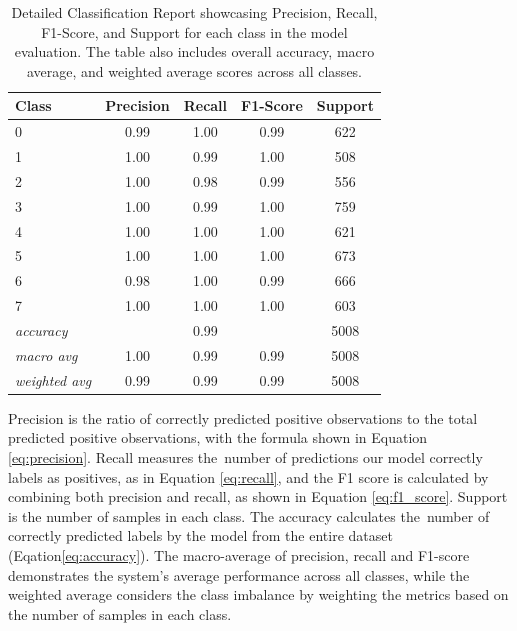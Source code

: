 \begin{table}[h]
	\centering
	\caption{Detailed Classification Report showcasing Precision, Recall, F1-Score, and Support for each class in the model evaluation. The table also includes overall accuracy, macro average, and weighted average scores across all classes.}
	\renewcommand{\arraystretch}{1.35} %
	\begin{tabular}{lcccc}
		\hline
		\textbf{Class} & \textbf{Precision} & \textbf{Recall} & \textbf{F1-Score} & \textbf{Support} \\ \hline
		0 & 0.99 & 1.00 & 0.99 & 622 \\
		1 & 1.00 & 0.99 & 1.00 & 508 \\
		2 & 1.00 & 0.98 & 0.99 & 556 \\
		3 & 1.00 & 0.99 & 1.00 & 759 \\
		4 & 1.00 & 1.00 & 1.00 & 621 \\
		5 & 1.00 & 1.00 & 1.00 & 673 \\
		6 & 0.98 & 1.00 & 0.99 & 666 \\
		7 & 1.00 & 1.00 & 1.00 & 603 \\
		\textit{accuracy}    &                   & 0.99            &                 & 5008             \\
		\textit{macro avg}   & 1.00               & 0.99            & 0.99              & 5008             \\
		\textit{weighted avg} & 0.99               & 0.99            & 0.99              & 5008             \\ \hline
	\end{tabular}
	\label{tab:report}
\end{table}

Precision is the ratio of correctly predicted positive observations to the total predicted positive observations, with the formula shown in Equation \ref{eq:precision}. Recall measures the~number of predictions our model correctly labels as positives, as in Equation \ref{eq:recall}, and the F1 score is calculated by combining both precision and recall, as shown in Equation \ref{eq:f1_score}. Support is the number of samples in each class. The accuracy calculates the~number of correctly predicted labels by the model from the entire dataset (Eqation\ref{eq:accuracy}). The macro-average of precision, recall and F1-score demonstrates the system's average performance across all classes, while the weighted average considers the class imbalance by weighting the metrics based on the number of samples in each class.

